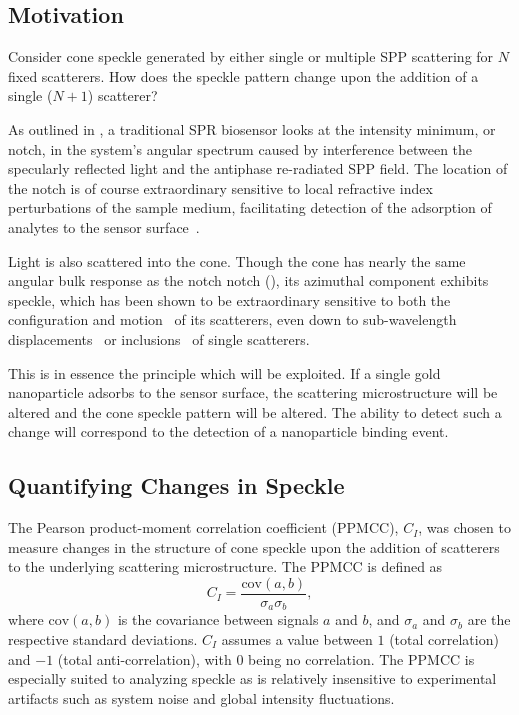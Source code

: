 \subsection{Motivation}
Consider cone speckle generated by either single or multiple SPP scattering
for $N$ fixed scatterers.  How does the speckle pattern change upon the
addition of a single ($N+1$) scatterer?  

As outlined in , a traditional SPR biosensor looks at
the intensity minimum, or notch, in the system's angular spectrum caused by
interference between the specularly reflected light and the antiphase
re-radiated SPP field.  The location of the notch is of course
extraordinary sensitive to local refractive index perturbations of the
sample medium, facilitating detection of the adsorption of analytes to the
sensor surface~\cite{homola1999surface}.  

Light is also scattered into the cone.  Though the cone has nearly the same
angular bulk response as the notch notch (), its azimuthal
component exhibits speckle, which has been shown to be extraordinary sensitive
to both the configuration and motion~\cite{berkovits1994correlations} of its
scatterers, even down to sub-wavelength
displacements~\cite{berkovits1991sensitivity} or
inclusions~\cite{berkovits1990theory} of single scatterers.

This is in essence the principle which will be exploited.  If a single gold
nanoparticle adsorbs to the sensor surface, the scattering microstructure will
be altered and the cone speckle pattern will be altered.  The ability to
detect such a change will correspond to the detection of a nanoparticle
binding event.

\subsection{Quantifying Changes in Speckle}

The Pearson product-moment correlation coefficient (PPMCC), $C_I$, was chosen
to measure changes in the structure of cone speckle upon the addition of
scatterers to the underlying scattering microstructure.  The PPMCC is defined
as
\begin{equation}
C_I = \frac{\mathrm{cov}(a,b)}{\sigma_a \sigma_b},
\label{eqn:pearsonproductmoment}
\end{equation}
where $\mathrm{cov}(a,b)$ is the covariance between signals $a$ and $b$,
and $\sigma_a$ and $\sigma_b$ are the respective standard deviations.  $C_I$
assumes a value between $1$ (total correlation) and $-1$ (total
anti-correlation), with $0$ being no correlation.  
The PPMCC is especially suited to analyzing speckle as is relatively
insensitive to experimental artifacts such as system noise and global
intensity fluctuations.

